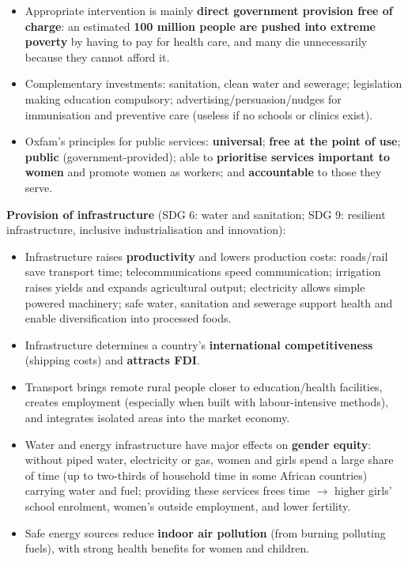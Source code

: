 \begin{itemize}
  \item Appropriate intervention is mainly \textbf{direct government provision free of charge}: an estimated \textbf{100 million people are pushed into extreme poverty} by having to pay for health care, and many die unnecessarily because they cannot afford it.
  \item Complementary investments: sanitation, clean water and sewerage; legislation making education compulsory; advertising/persuasion/nudges for immunisation and preventive care (useless if no schools or clinics exist).
  \item Oxfam's principles for public services: \textbf{universal}; \textbf{free at the point of use}; \textbf{public} (government-provided); able to \textbf{prioritise services important to women} and promote women as workers; and \textbf{accountable} to those they serve.
\end{itemize}
\textbf{Provision of infrastructure} (SDG 6: water and sanitation; SDG 9: resilient infrastructure, inclusive industrialisation and innovation):
\begin{itemize}
  \item Infrastructure raises \textbf{productivity} and lowers production costs: roads/rail save transport time; telecommunications speed communication; irrigation raises yields and expands agricultural output; electricity allows simple powered machinery; safe water, sanitation and sewerage support health and enable diversification into processed foods.
  \item Infrastructure determines a country's \textbf{international competitiveness} (shipping costs) and \textbf{attracts FDI}.
  \item Transport brings remote rural people closer to education/health facilities, creates employment (especially when built with labour-intensive methods), and integrates isolated areas into the market economy.
  \item Water and energy infrastructure have major effects on \textbf{gender equity}: without piped water, electricity or gas, women and girls spend a large share of time (up to two-thirds of household time in some African countries) carrying water and fuel; providing these services frees time $\to$ higher girls' school enrolment, women's outside employment, and lower fertility.
  \item Safe energy sources reduce \textbf{indoor air pollution} (from burning polluting fuels), with strong health benefits for women and children.
\end{itemize}

